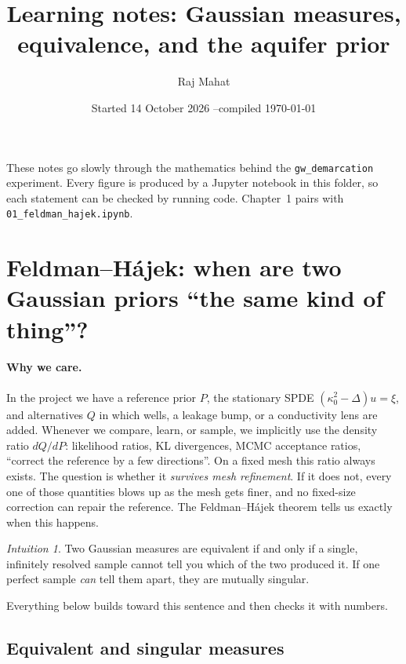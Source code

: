 \documentclass[11pt]{article}
\title{Learning notes: Gaussian measures, equivalence, and the aquifer prior}
\author{Raj Mahat}
\date{Started 14 October 2026 \quad--\quad compiled \today}
\theoremstyle{definition}
\theoremstyle{remark}
\newtheorem*{intuition}{Intuition}
\newcommand{\nb}{\texttt{01\_feldman\_hajek.ipynb}}
\begin{document}
\maketitle

\noindent These notes go slowly through the mathematics behind the \texttt{gw\_demarcation} experiment.
Every figure is produced by a Jupyter notebook in this folder, so each statement can be checked by
running code. Chapter~1 pairs with \nb.

\tableofcontents

\section{Feldman--H\'ajek: when are two Gaussian priors ``the same kind of thing''?}

\paragraph{Why we care.}
In the project we have a reference prior $P$, the stationary SPDE $(\kappa_0^2-\Delta)u=\xi$, and
alternatives $Q$ in which wells, a leakage bump, or a conductivity lens are added. Whenever we
compare, learn, or sample, we implicitly use the density ratio $dQ/dP$: likelihood ratios, KL
divergences, MCMC acceptance ratios, ``correct the reference by a few directions''. On a fixed
mesh this ratio always exists. The question is whether it \emph{survives mesh refinement}. If it
does not, every one of those quantities blows up as the mesh gets finer, and no fixed-size correction
can repair the reference. The Feldman--H\'ajek theorem tells us exactly when this happens.

\begin{intuition}
Two Gaussian measures are equivalent if and only if a single, infinitely resolved sample cannot tell
you which of the two produced it. If one perfect sample \emph{can} tell them apart, they are
mutually singular.
\end{intuition}

Everything below builds toward this sentence and then checks it with numbers.

\subsection{Equivalent and singular measures}
\end{document}
